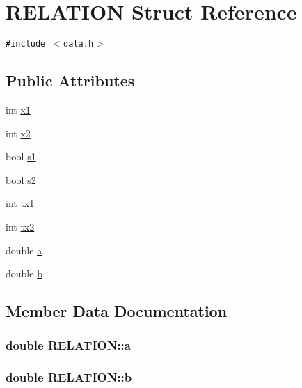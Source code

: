 \hypertarget{struct_r_e_l_a_t_i_o_n}{
\section{RELATION Struct Reference}
\label{struct_r_e_l_a_t_i_o_n}
}
{\tt \#include $<$data.h$>$}

\subsection*{Public Attributes}
\begin{CompactItemize}
\item 
int \hyperlink{struct_r_e_l_a_t_i_o_n_828d3641ed3c80772dce2e3b2d40ec44}{x1}
\item 
int \hyperlink{struct_r_e_l_a_t_i_o_n_729fed1d19fef0721d5dc9ceb262433b}{x2}
\item 
bool \hyperlink{struct_r_e_l_a_t_i_o_n_2ac328d5779e9ec4e2acdbb1d3dd7117}{s1}
\item 
bool \hyperlink{struct_r_e_l_a_t_i_o_n_e32f6b4cf22feedaae833293c8b011fc}{s2}
\item 
int \hyperlink{struct_r_e_l_a_t_i_o_n_52cc203721e55dbfd14c9dcc8a7257ba}{tx1}
\item 
int \hyperlink{struct_r_e_l_a_t_i_o_n_fcc821a6adc44b264a6c7e626e3b28ec}{tx2}
\item 
double \hyperlink{struct_r_e_l_a_t_i_o_n_bbe2df22e7bd146ca9a4741d95890987}{a}
\item 
double \hyperlink{struct_r_e_l_a_t_i_o_n_b3037944e494d04d24b4db797c1a5cd8}{b}
\end{CompactItemize}


\subsection{Member Data Documentation}
\hypertarget{struct_r_e_l_a_t_i_o_n_bbe2df22e7bd146ca9a4741d95890987}{
\subsubsection[{a}]{\setlength{\rightskip}{0pt plus 5cm}double {\bf RELATION::a}}}
\label{struct_r_e_l_a_t_i_o_n_bbe2df22e7bd146ca9a4741d95890987}


\hypertarget{struct_r_e_l_a_t_i_o_n_b3037944e494d04d24b4db797c1a5cd8}{
\subsubsection[{b}]{\setlength{\rightskip}{0pt plus 5cm}double {\bf RELATION::b}}}
\label{struct_r_e_l_a_t_i_o_n_b3037944e494d04d24b4db797c1a5cd8}


